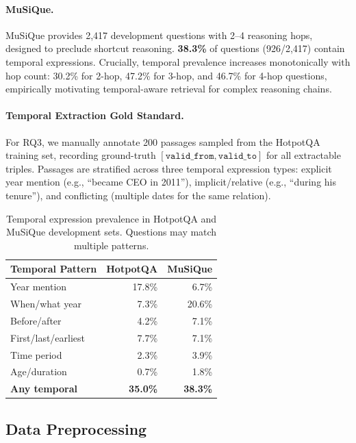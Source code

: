 \documentclass[11pt]{article}
\begin{document}
\paragraph{MuSiQue.}
MuSiQue \cite{trivedi2022musique} provides 2,417 development questions
with 2--4 reasoning hops, designed to preclude shortcut reasoning.
\textbf{38.3\%} of questions (926/2,417) contain temporal expressions.
Crucially, temporal prevalence increases monotonically with hop count:
30.2\% for 2-hop, 47.2\% for 3-hop, and 46.7\% for 4-hop questions,
empirically motivating temporal-aware retrieval for complex reasoning chains.

\paragraph{Temporal Extraction Gold Standard.}
For RQ3, we manually annotate 200 passages sampled from the HotpotQA
training set, recording ground-truth $[\mathtt{valid\_from},
\mathtt{valid\_to}]$ for all extractable triples. Passages are stratified
across three temporal expression types: explicit year mention (e.g.,
``became CEO in 2011''), implicit/relative (e.g., ``during his tenure''),
and conflicting (multiple dates for the same relation).

\begin{table}[t]
  \centering
  \small
  \begin{tabular}{lrr}
    \toprule
    \textbf{Temporal Pattern} & \textbf{HotpotQA} & \textbf{MuSiQue} \\
    \midrule
    Year mention        & 17.8\% & 6.7\%  \\
    When/what year      & 7.3\%  & 20.6\% \\
    Before/after        & 4.2\%  & 7.1\%  \\
    First/last/earliest & 7.7\%  & 7.1\%  \\
    Time period         & 2.3\%  & 3.9\%  \\
    Age/duration        & 0.7\%  & 1.8\%  \\
    \midrule
    \textbf{Any temporal} & \textbf{35.0\%} & \textbf{38.3\%} \\
    \bottomrule
  \end{tabular}
  \caption{Temporal expression prevalence in HotpotQA and MuSiQue
  development sets. Questions may match multiple patterns.}
  \label{tab:eda}
\end{table}

\subsection{Data Preprocessing}
\end{document}

